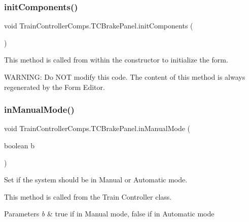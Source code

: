 \subsubsection{\texorpdfstring{init\+Components()}{initComponents()}}
{\footnotesize\ttfamily void Train\+Controller\+Comps.\+T\+C\+Brake\+Panel.\+init\+Components (\begin{DoxyParamCaption}{ }\end{DoxyParamCaption})\hspace{0.3cm}{\ttfamily [private]}}



This method is called from within the constructor to initialize the form. 

W\+A\+R\+N\+I\+NG\+: Do N\+OT modify this code. The content of this method is always regenerated by the Form Editor. \mbox{\label{classTrainControllerComps_1_1TCBrakePanel_a4ba678ac423a17477b5b15077c55cb7a}} 
\subsubsection{\texorpdfstring{in\+Manual\+Mode()}{inManualMode()}}
{\footnotesize\ttfamily void Train\+Controller\+Comps.\+T\+C\+Brake\+Panel.\+in\+Manual\+Mode (\begin{DoxyParamCaption}\item[{boolean}]{b }\end{DoxyParamCaption})}



Set if the system should be in Manual or Automatic mode. 

This method is called from the Train Controller class.


\begin{DoxyParams}{Parameters}
{\em b} & true if in Manual mode, false if in Automatic mode \\
\hline
\end{DoxyParams}
\mbox{\label{classTrainControllerComps_1_1TCBrakePanel_a901968694edba045f8ee6216d89a4096}} 
